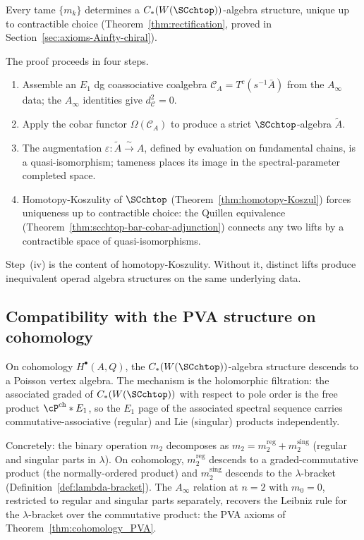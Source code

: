 Every tame $\{m_k\}$ determines a $C_\ast(W(\SCchtop))$-algebra
structure, unique up to contractible choice (Theorem~\ref{thm:rectification},
proved in Section~\ref{sec:axioms-Ainfty-chiral}).

The proof proceeds in four steps.
\begin{enumerate}[label=\textup{(\roman*)}]
\item Assemble an $E_1$ dg coassociative coalgebra $\mathcal{C}_A = T^c(s^{-1}\bar A)$
 from the $A_\infty$ data; the $A_\infty$ identities give $d_{\mathcal{C}}^2 = 0$.
\item Apply the cobar functor $\Omega(\mathcal{C}_A)$ to produce a strict
 $\SCchtop$-algebra $\widetilde A$.
\item The augmentation $\varepsilon\colon \widetilde A \xrightarrow{\;\sim\;} A$,
 defined by evaluation on fundamental chains, is a quasi-isomorphism;
 tameness places its image in the spectral-parameter completed space.
\item Homotopy-Koszulity of $\SCchtop$ (Theorem~\ref{thm:homotopy-Koszul})
 forces uniqueness up to contractible choice: the Quillen equivalence
 (Theorem~\ref{thm:scchtop-bar-cobar-adjunction}) connects any two lifts
 by a contractible space of quasi-isomorphisms.
\end{enumerate}

Step~(iv) is the content of homotopy-Koszulity. Without it, distinct
lifts produce inequivalent operad algebra structures on the same
underlying data.

\subsection{Compatibility with the PVA structure on cohomology}
\label{subsec:compat-PVA-equiv}

On cohomology $H^\bullet(A, Q)$, the $C_\ast(W(\SCchtop))$-algebra
structure descends to a Poisson vertex algebra. The mechanism is the
holomorphic filtration: the associated graded of $C_\ast(W(\SCchtop))$
with respect to pole order is the free product $\cP^{\mathrm{ch}} * E_1$,
so the $E_1$ page of the associated spectral sequence carries
commutative-associative (regular) and Lie (singular) products
independently.

Concretely: the binary operation $m_2$ decomposes as
$m_2 = m_2^{\mathrm{reg}} + m_2^{\mathrm{sing}}$ (regular and singular
parts in $\lambda$). On cohomology, $m_2^{\mathrm{reg}}$ descends
to a graded-commutative product (the normally-ordered product) and
$m_2^{\mathrm{sing}}$ descends to the $\lambda$-bracket
(Definition~\ref{def:lambda-bracket}). The $A_\infty$ relation at
$n = 2$ with $m_0 = 0$, restricted to regular and singular parts
separately, recovers the Leibniz rule for the $\lambda$-bracket
over the commutative product: the PVA axioms of
Theorem~\ref{thm:cohomology_PVA}.

